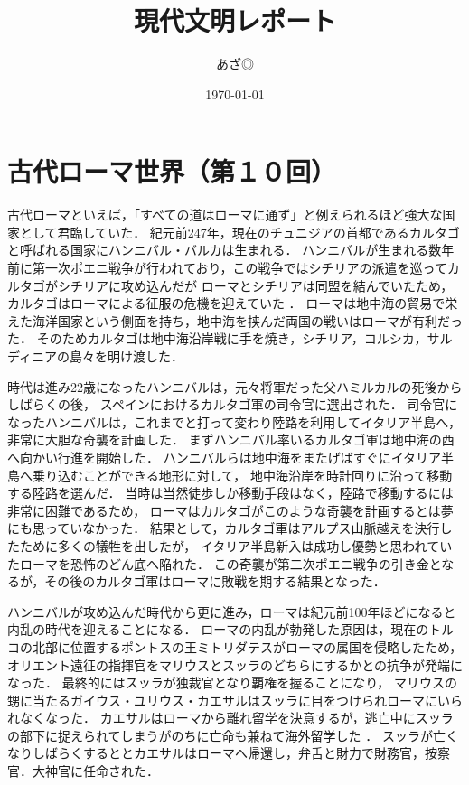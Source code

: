 \documentclass[10.5pt, aJ4]{jarticle}
\author{あざ◎}
\date{\today}
\title{現代文明レポート}
\begin{document}
\maketitle
\tableofcontents
\vspace{10mm}


\section{古代ローマ世界（第１０回）}
\label{sec:org199beb3}

古代ローマといえば，「すべての道はローマに通ず」と例えられるほど強大な国家として君臨していた．
紀元前247年，現在のチュニジアの首都であるカルタゴと呼ばれる国家にハンニバル・バルカは生まれる．
ハンニバルが生まれる数年前に第一次ポエニ戦争が行われており，この戦争ではシチリアの派遣を巡ってカルタゴがシチリアに攻め込んだが
ローマとシチリアは同盟を結んでいたため，カルタゴはローマによる征服の危機を迎えていた \cite{Hannibal+NationalGeographic} ．
ローマは地中海の貿易で栄えた海洋国家という側面を持ち，地中海を挟んだ両国の戦いはローマが有利だった．
そのためカルタゴは地中海沿岸戦に手を焼き，シチリア，コルシカ，サルディニアの島々を明け渡した．

時代は進み22歳になったハンニバルは，元々将軍だった父ハミルカルの死後からしばらくの後，
スペインにおけるカルタゴ軍の司令官に選出された．
司令官になったハンニバルは，これまでと打って変わり陸路を利用してイタリア半島へ，非常に大胆な奇襲を計画した．
まずハンニバル率いるカルタゴ軍は地中海の西へ向かい行進を開始した．
ハンニバルらは地中海をまたげばすぐにイタリア半島へ乗り込むことができる地形に対して，
地中海沿岸を時計回りに沿って移動する陸路を選んだ．
当時は当然徒歩しか移動手段はなく，陸路で移動するには非常に困難であるため，
ローマはカルタゴがこのような奇襲を計画するとは夢にも思っていなかった．
結果として，カルタゴ軍はアルプス山脈越えを決行したために多くの犠牲を出したが，
イタリア半島新入は成功し優勢と思われていたローマを恐怖のどん底へ陥れた．
この奇襲が第二次ポエニ戦争の引き金となるが，その後のカルタゴ軍はローマに敗戦を期する結果となった．

ハンニバルが攻め込んだ時代から更に進み，ローマは紀元前100年ほどになると内乱の時代を迎えることになる．
ローマの内乱が勃発した原因は，現在のトルコの北部に位置するポントスの王ミトリダテスがローマの属国を侵略したため，
オリエント遠征の指揮官をマリウスとスッラのどちらにするかとの抗争が発端になった．
最終的にはスッラが独裁官となり覇権を握ることになり，
マリウスの甥に当たるガイウス・ユリウス・カエサルはスッラに目をつけられローマにいられなくなった．
カエサルはローマから離れ留学を決意するが，逃亡中にスッラの部下に捉えられてしまうがのちに亡命も兼ねて海外留学した \cite{Caesar+Y-History} ．
スッラが亡くなりしばらくするととカエサルはローマへ帰還し，弁舌と財力で財務官，按察官．大神官に任命された．
\end{document}

